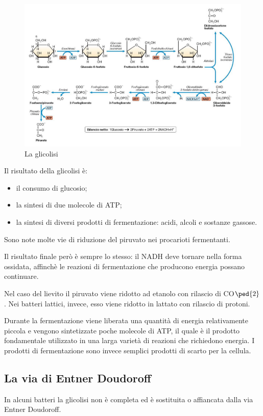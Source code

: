 \documentclass[11pt]{book}
\begin{document}
\clearpage
\begin{figure}[htp]
\centering
\includegraphics[scale=0.6]{img/Glicolisi.png}
\caption{La glicolisi}
\label{}
\end{figure}

Il risultato della glicolisi è:
\begin{itemize}
\item il consumo di glucosio;
\item la sintesi di due molecole di ATP;
\item la sintesi di diversi prodotti di fermentazione: acidi, alcoli e sostanze gassose.
\end{itemize}

Sono note molte vie di riduzione del piruvato nei procarioti fermentanti. 

Il risultato finale però è sempre lo stesso: il NADH deve tornare nella forma ossidata, affinchè le reazioni di fermentazione che producono energia possano continuare.

Nel caso del lievito il piruvato viene ridotto ad etanolo con rilascio di CO$\ped{2}$. Nei batteri lattici, invece, esso viene ridotto in lattato con rilascio di protoni.

Durante la fermentazione viene liberata una quantità di energia relativamente piccola e vengono sintetizzate poche molecole di ATP, il quale è il prodotto fondamentale utilizzato in una larga varietà di reazioni che richiedono energia.
I prodotti di fermentazione sono invece semplici prodotti di scarto per la cellula.

\clearpage
\subsection{La via di Entner Doudoroff }
In alcuni batteri la glicolisi non è completa ed è sostituita o affiancata dalla via Entner Doudoroff.
\end{document}
